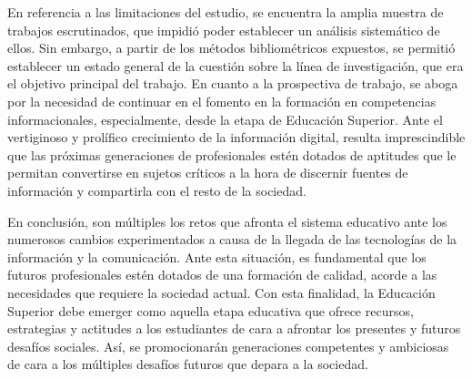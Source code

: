 \documentclass{textolivre}
\begin{document}
En referencia a las limitaciones del estudio, se encuentra la amplia muestra de trabajos escrutinados, que impidió poder establecer un análisis sistemático de ellos. Sin embargo, a partir de los métodos bibliométricos expuestos, se permitió establecer un estado general de la cuestión sobre la línea de investigación, que era el objetivo principal del trabajo. En cuanto a la prospectiva de trabajo, se aboga por la necesidad de continuar en el fomento en la formación en competencias informacionales, especialmente, desde la etapa de Educación Superior. Ante el vertiginoso y prolífico crecimiento de la información digital, resulta imprescindible que las próximas generaciones de profesionales estén dotados de aptitudes que le permitan convertirse en sujetos críticos a la hora de discernir fuentes de información y compartirla con el resto de la sociedad.

En conclusión, son múltiples los retos que afronta el sistema educativo ante los numerosos cambios experimentados a causa de la llegada de las tecnologías de la información y la comunicación. Ante esta situación, es fundamental que los futuros profesionales estén dotados de una formación de calidad, acorde a las necesidades que requiere la sociedad actual. Con esta finalidad, la Educación Superior debe emerger como aquella etapa educativa que ofrece recursos, estrategias y actitudes a los estudiantes de cara a afrontar los presentes y futuros desafíos sociales. Así, se promocionarán generaciones competentes y ambiciosas de cara a los múltiples desafíos futuros que depara a la sociedad.






\printbibliography\label{sec-bib}
\end{document}
